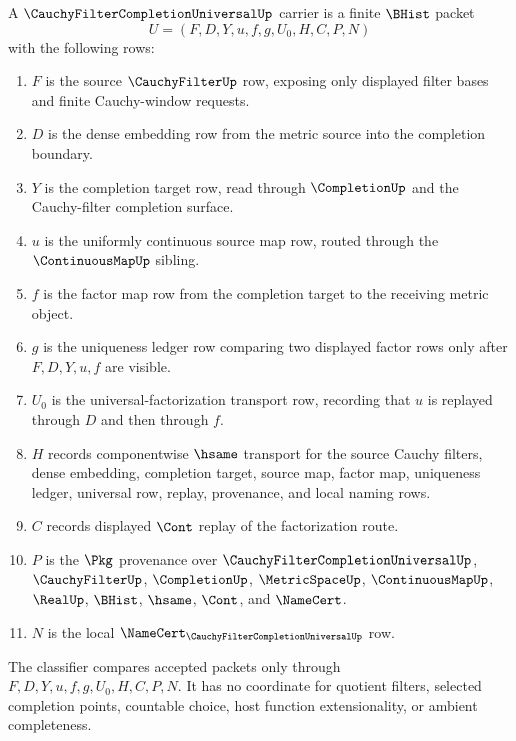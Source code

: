 \begin{definition}
\label{def:cauchy-filter-completion-universal-carrier}
A $\CauchyFilterCompletionUniversalUp$ carrier is a finite $\BHist$ packet
$$
U=(F,D,Y,u,f,g,U_0,H,C,P,N)
$$
with the following rows:
\begin{enumerate}
\item $F$ is the source $\CauchyFilterUp$ row, exposing only displayed filter bases and finite Cauchy-window requests.
\item $D$ is the dense embedding row from the metric source into the completion boundary.
\item $Y$ is the completion target row, read through $\CompletionUp$ and the Cauchy-filter completion surface.
\item $u$ is the uniformly continuous source map row, routed through the $\ContinuousMapUp$ sibling.
\item $f$ is the factor map row from the completion target to the receiving metric object.
\item $g$ is the uniqueness ledger row comparing two displayed factor rows only after $F,D,Y,u,f$ are visible.
\item $U_0$ is the universal-factorization transport row, recording that $u$ is replayed through $D$ and then through $f$.
\item $H$ records componentwise $\hsame$ transport for the source Cauchy filters, dense embedding, completion target, source map, factor map, uniqueness ledger, universal row, replay, provenance, and local naming rows.
\item $C$ records displayed $\Cont$ replay of the factorization route.
\item $P$ is the $\Pkg$ provenance over $\CauchyFilterCompletionUniversalUp$, $\CauchyFilterUp$, $\CompletionUp$, $\MetricSpaceUp$, $\ContinuousMapUp$, $\RealUp$, $\BHist$, $\hsame$, $\Cont$, and $\NameCert$.
\item $N$ is the local $\NameCert_{\CauchyFilterCompletionUniversalUp}$ row.
\end{enumerate}
The classifier compares accepted packets only through $F,D,Y,u,f,g,U_0,H,C,P,N$. It has no coordinate for quotient filters, selected completion points, countable choice, host function extensionality, or ambient completeness.
\end{definition}

